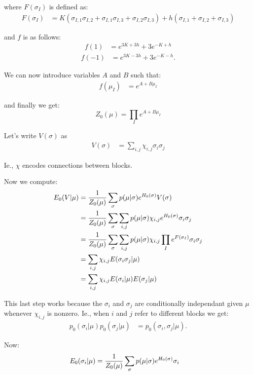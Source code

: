 \documentclass[11pt]{article}
\begin{document}
where $F(\sigma_I)$ is defined as:
\begin{align*}
F(\sigma_{I}) &= K(\sigma_{I,1}\sigma_{I,2}+\sigma_{I,1}\sigma_{I,3}+\sigma_{I,2}\sigma_{I,3})+h(\sigma_{I,1}+\sigma_{I,2}+\sigma_{I,3})
\end{align*}

and $f$ is as follows:
\begin{align*}
f(1) &= e^{3K+3h}+3e^{-K+h}
\end{align*}
\begin{align*}
f(-1) &= e^{3K-3h}+3e^{-K-h}.
\end{align*}

We can now introduce variables $A$ and $B$ such that:
\begin{align*}
f(\mu_{I}) &= e^{A+B\mu_{I}}
\end{align*}

and finally we get:
$$\boxed{Z_{0}(\mu) = \prod_{I} e^{A+B\mu_{I}}}$$


Let's write $V(\sigma)$ as
\begin{align*}
V(\sigma) &= \sum_{i,j} \chi_{i,j}\sigma_{i}\sigma_{j}
\end{align*}

Ie., $\chi$ encodes connections between blocks.

Now we compute:
\begin{align*}
E_{0}(V | \mu) &= {{1} \over {Z_{0}(\mu)}}\sum_{\sigma} p(\mu | \sigma)e^{H_{0}(\sigma)}V(\sigma)\\
 &= {{1} \over {Z_{0}(\mu)}}\sum_{\sigma} \sum_{i,j} p(\mu | \sigma)\chi_{i,j}e^{H_{0}(\sigma)}\sigma_{i}\sigma_{j}\\
 &= {{1} \over {Z_{0}(\mu)}}\sum_{\sigma} \sum_{i,j} p(\mu | \sigma)\chi_{i,j}\prod_{I} e^{F(\sigma_{I})}\sigma_{i}\sigma_{j}\\
 &= \sum_{i,j} \chi_{i,j}E(\sigma_{i}\sigma_{j} | \mu)\\
 &= \sum_{i,j} \chi_{i,j}E(\sigma_{i} | \mu)E(\sigma_{j} | \mu)
\end{align*}

This last step works because the $\sigma_i$ and $\sigma_j$ are
conditionally independant given $\mu$ whenever $\chi_{i, j}$ is
nonzero. Ie., when $i$ and $j$ refer to different blocks we get:
\begin{align*}
p_{0}(\sigma_{i} | \mu)p_{0}(\sigma_{j} | \mu) &= p_{0}(\sigma_{i}, \sigma_{j} | \mu).
\end{align*}

Now:
\begin{align*}
E_{0}(\sigma_{i} | \mu) &= {{1} \over {Z_{0}(\mu)}}\sum_{\sigma} p(\mu | \sigma)e^{H_{0}(\sigma)}\sigma_{i}
\end{align*}
\end{document}
